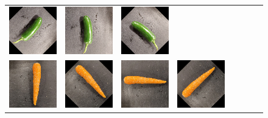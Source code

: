 \begin{figure}[tp]
\begin{center}
\begin{tabular}{c|ccccccc}
			\includegraphics[scale=0.4]{./img/jalapeno_5.png} &
			\includegraphics[scale=0.4]{./img/jalapeno_6.png} &
			\includegraphics[scale=0.4]{./img/jalapeno_7.png} \\
			\includegraphics[scale=0.4]{./img/carrot_0.png} &
			\includegraphics[scale=0.4]{./img/carrot_1.png} &
			\includegraphics[scale=0.4]{./img/carrot_2.png} &
			\includegraphics[scale=0.4]{./img/carrot_3.png} &

\end{tabular}
\end{center}
\end{figure}
